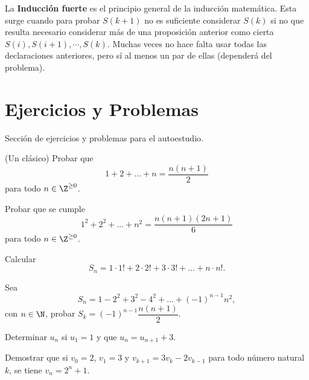 La \textbf{Inducción fuerte} es el principio general de la inducción matemática.
Esta surge cuando para probar $S(k + 1)$ no es suficiente considerar $S(k)$ si no que resulta necesario considerar más de una proposición anterior como cierta $S(i), S(i + 1), \cdots, S(k)$.
Muchas veces no hace falta usar todas las declaraciones anteriores, pero sí al menos un par de ellas (dependerá del problema).


\section{Ejercicios y Problemas}

Sección de ejercicios y problemas para el autoestudio.

\showLine
\begin{multicols}{2}

    \begin{exercise}{(Un clásico)}
        Probar que
        \[
            1 + 2 + \dots + n = \dfrac{n(n+1)}{2}
        \]
        para todo $n \in \Z^{\geq 0}$.
    \end{exercise}

    \begin{exercise}
        Probar que se cumple
        \[
            1^2 + 2^2 + \dots + n^2 = \dfrac{n(n+1)(2n+1)}{6}
        \]
        para todo $n \in \Z^{\geq 0}$.
    \end{exercise}

    \begin{exercise}
        Calcular
        \[
            S_n = 1 \cdot 1! + 2 \cdot 2! + 3 \cdot 3! + \ldots + n \cdot n!.
        \]
    \end{exercise}

    \begin{exercise}
        Sea
        \[
            S_n = 1 - 2^2 + 3^2 - 4^2 + \ldots + (-1)^{n - 1} n^2,
        \]
        con $n \in \N$, probar $S_k = (-1)^{n - 1} \dfrac{n(n+1)}{2}$.
    \end{exercise}

    \begin{exercise}
        Determinar $u_n$ si $u_1 = 1$ y que $u_n = u_{n + 1} + 3$.
    \end{exercise}

    \begin{exercise}
        Demostrar que si $v_0 = 2$, $v_1 = 3$ y $v_{k + 1} = 3v_k - 2 v_{k - 1}$ para todo número natural $k$, se tiene $v_n = 2^n + 1$.
    \end{exercise}


\end{multicols}
